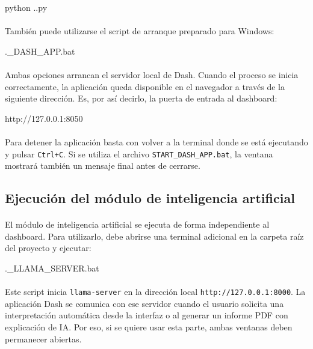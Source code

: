 \begin{bloquecomando}
python .\cargaDataset.py
\end{bloquecomando}

\paragraph*{}También puede utilizarse el script de arranque preparado para Windows:

\begin{bloquecomando}
.\START_DASH_APP.bat
\end{bloquecomando}

\paragraph*{}Ambas opciones arrancan el servidor local de Dash. Cuando el proceso se inicia correctamente, la aplicación queda disponible en el navegador a través de la siguiente dirección. Es, por así decirlo, la puerta de entrada al dashboard:

\begin{bloquecomando}
http://127.0.0.1:8050
\end{bloquecomando}

\paragraph*{}Para detener la aplicación basta con volver a la terminal donde se está ejecutando y pulsar \texttt{Ctrl+C}. Si se utiliza el archivo \texttt{START\_DASH\_APP.bat}, la ventana mostrará también un mensaje final antes de cerrarse.

\subsection{Ejecución del módulo de inteligencia artificial}

\paragraph*{}El módulo de inteligencia artificial se ejecuta de forma independiente al dashboard. Para utilizarlo, debe abrirse una terminal adicional en la carpeta raíz del proyecto y ejecutar:

\begin{bloquecomando}
.\START_LLAMA_SERVER.bat
\end{bloquecomando}

\paragraph*{}Este script inicia \texttt{llama-server} en la dirección local \texttt{http://127.0.0.1:8000}. La aplicación Dash se comunica con ese servidor cuando el usuario solicita una interpretación automática desde la interfaz o al generar un informe PDF con explicación de IA. Por eso, si se quiere usar esta parte, ambas ventanas deben permanecer abiertas.

